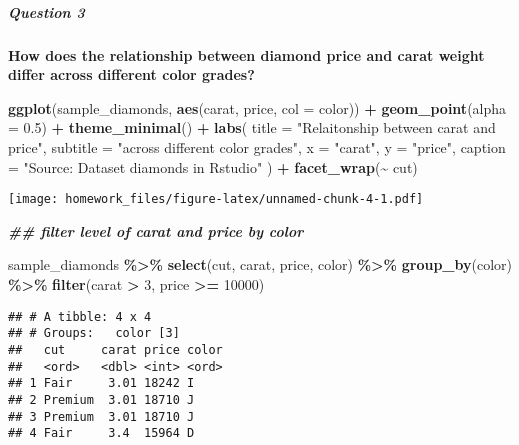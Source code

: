 \documentclass[
]{article}
\newenvironment{Shaded}{\begin{snugshade}}{\end{snugshade}}
\newcommand{\AttributeTok}[1]{\textcolor[rgb]{0.13,0.29,0.53}{#1}}
\newcommand{\DecValTok}[1]{\textcolor[rgb]{0.00,0.00,0.81}{#1}}
\newcommand{\DocumentationTok}[1]{\textcolor[rgb]{0.56,0.35,0.01}{\textbf{\textit{#1}}}}
\newcommand{\FloatTok}[1]{\textcolor[rgb]{0.00,0.00,0.81}{#1}}
\newcommand{\FunctionTok}[1]{\textcolor[rgb]{0.13,0.29,0.53}{\textbf{#1}}}
\newcommand{\NormalTok}[1]{#1}
\newcommand{\SpecialCharTok}[1]{\textcolor[rgb]{0.81,0.36,0.00}{\textbf{#1}}}
\newcommand{\StringTok}[1]{\textcolor[rgb]{0.31,0.60,0.02}{#1}}
\begin{document}
\hypertarget{question-3}{%
\subparagraph{\texorpdfstring{\textbf{Question
3}}{Question 3}}\label{question-3}}

\textbf{How does the relationship between diamond price and carat weight
differ across different color grades?}

\begin{Shaded}
\begin{Highlighting}[]
\FunctionTok{ggplot}\NormalTok{(sample\_diamonds, }
       \FunctionTok{aes}\NormalTok{(carat, price, }\AttributeTok{col =}\NormalTok{ color)) }\SpecialCharTok{+}
  \FunctionTok{geom\_point}\NormalTok{(}\AttributeTok{alpha =} \FloatTok{0.5}\NormalTok{) }\SpecialCharTok{+}
  \FunctionTok{theme\_minimal}\NormalTok{() }\SpecialCharTok{+}
  \FunctionTok{labs}\NormalTok{(}
    \AttributeTok{title =} \StringTok{"Relaitonship between carat and price"}\NormalTok{,}
    \AttributeTok{subtitle =} \StringTok{"across different color grades"}\NormalTok{,}
    \AttributeTok{x =} \StringTok{"carat"}\NormalTok{,}
    \AttributeTok{y =} \StringTok{"price"}\NormalTok{,}
    \AttributeTok{caption =} \StringTok{"Source: Dataset diamonds in Rstudio"}
\NormalTok{  ) }\SpecialCharTok{+}
  \FunctionTok{facet\_wrap}\NormalTok{(}\SpecialCharTok{\textasciitilde{}}\NormalTok{ cut)}
\end{Highlighting}
\end{Shaded}

\texttt{[image: homework\_files/figure-latex/unnamed-chunk-4-1.pdf]}

\begin{Shaded}
\begin{Highlighting}[]
\DocumentationTok{\#\# filter level of carat and price by color}

\NormalTok{sample\_diamonds }\SpecialCharTok{\%\textgreater{}\%}
  \FunctionTok{select}\NormalTok{(cut, carat, price, color) }\SpecialCharTok{\%\textgreater{}\%}
  \FunctionTok{group\_by}\NormalTok{(color) }\SpecialCharTok{\%\textgreater{}\%}
  \FunctionTok{filter}\NormalTok{(carat }\SpecialCharTok{\textgreater{}} \DecValTok{3}\NormalTok{, price }\SpecialCharTok{\textgreater{}=} \DecValTok{10000}\NormalTok{) }
\end{Highlighting}
\end{Shaded}

\begin{verbatim}
## # A tibble: 4 x 4
## # Groups:   color [3]
##   cut     carat price color
##   <ord>   <dbl> <int> <ord>
## 1 Fair     3.01 18242 I    
## 2 Premium  3.01 18710 J    
## 3 Premium  3.01 18710 J    
## 4 Fair     3.4  15964 D
\end{verbatim}
\end{document}
